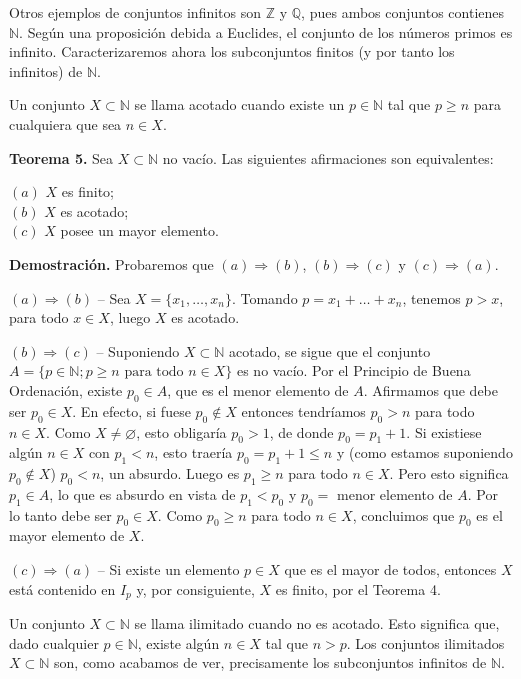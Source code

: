 Otros ejemplos de conjuntos infinitos son \( \mathbb{Z} \) y \( \mathbb{Q} \), pues ambos conjuntos contienes \( \mathbb{N} \). Según una proposición debida a Euclides, el conjunto de los números primos es infinito. Caracterizaremos ahora los subconjuntos finitos (y por tanto los infinitos) de \( \mathbb{N} \).

Un conjunto \( X \subset \mathbb{N} \) se llama acotado cuando existe un \( p \in \mathbb{N} \) tal que \( p \geq n \) para cualquiera que sea \( n \in X \).

\textbf{Teorema 5.} Sea \( X \subset \mathbb{N} \) no vacío. Las siguientes afirmaciones son equivalentes:

$(a)$ \( X \) es finito;\\
$(b)$ \( X \) es acotado;\\
$(c)$ \( X \) posee un mayor elemento.

\textbf{Demostración.} Probaremos que $(a) \Rightarrow (b)$, $(b) \Rightarrow (c)$ y $(c) \Rightarrow (a)$.

$(a) \Rightarrow (b)$ – Sea \( X = \{x_1, \dots, x_n\} \). Tomando \( p = x_1 + \dots + x_n \), tenemos \( p > x \), para todo \( x \in X \), luego \( X \) es acotado.

$(b) \Rightarrow (c)$ – Suponiendo \( X \subset \mathbb{N} \) acotado, se sigue que el conjunto \( A = \{ p \in \mathbb{N} ; p \geq n \text{ para todo } n \in X \} \) es no vacío. Por el Principio de Buena Ordenación, existe \( p_0 \in A \), que es el menor elemento de \( A \). Afirmamos que debe ser \( p_0 \in X \). En efecto, si fuese \( p_0 \notin X \) entonces tendríamos \( p_0 > n \) para todo \( n \in X \). Como \( X \neq \varnothing \), esto obligaría \( p_0 > 1 \), de donde \( p_0 = p_1 + 1 \). Si existiese algún \( n \in X \) con \( p_1 < n \), esto traería \( p_0 = p_1 + 1 \leq n \) y (como estamos suponiendo \( p_0 \notin X \)) \( p_0 < n \), un absurdo. Luego es \( p_1 \geq n \) para todo \( n \in X \). Pero esto significa \( p_1 \in A \), lo que es absurdo en vista de \( p_1 < p_0 \) y \( p_0 = \) menor elemento de \( A \). Por lo tanto debe ser \( p_0 \in X \). Como \( p_0 \geq n \) para todo \( n \in X \), concluimos que \( p_0 \) es el mayor elemento de \( X \).

$(c) \Rightarrow (a)$ – Si existe un elemento \( p \in X \) que es el mayor de todos, entonces \( X \) está contenido en \( I_p \) y, por consiguiente, \( X \) es finito, por el Teorema 4.

Un conjunto \( X \subset \mathbb{N} \) se llama ilimitado cuando no es acotado. Esto significa que, dado cualquier \( p \in \mathbb{N} \), existe algún \( n \in X \) tal que \( n > p \). Los conjuntos ilimitados \( X \subset \mathbb{N} \) son, como acabamos de ver, precisamente los subconjuntos infinitos de \( \mathbb{N} \).

